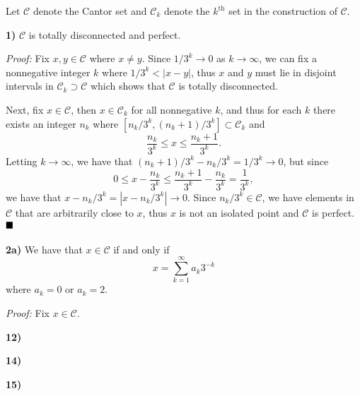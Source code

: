 \documentclass[12pt]{article}
\newcommand{\vertb}[1]{\left\vert#1\right\vert}
\newcommand{\mc}[1]{\ensuremath{\mathcal{#1}}}
\newcommand{\done}{\ensuremath{\strut\hfill\blacksquare}}
\newcommand{\proof}{\textit{Proof: }}
\begin{document}
\pagestyle{fancy}

\setlength{\parindent}{0in}
\setlength{\parskip}{0.1in}

Let \( \mc{C} \) denote the Cantor set and \( \mc{C}_k \) denote the
\( k^\text{th} \) set in the construction of \( \mc{C} \).

\textbf{1)} \( \mc{C} \) is totally disconnected and perfect.

\proof
Fix \( x, y \in \mc{C} \) where \( x \ne y \).
Since \( 1 / 3^k \to 0 \) as \( k \to \infty \), we can fix a nonnegative
integer \( k \) where \( 1 / 3^k < \vertb{x - y} \), thus \( x \) and \( y \)
must lie in disjoint intervals in \( \mc{C}_k \supset \mc{C} \) which
shows that \( \mc{C} \) is totally disconnected.

Next, fix \( x \in \mc{C} \), then \( x \in \mc{C}_k \) for all nonnegative
\( k \), and thus for each \( k \) there exists an integer \( n_k \) where
\( [n_k / 3^k, (n_k + 1) / 3^k] \subset \mc{C}_k \) and
\[
	\frac{n_k}{3^k} \leq x \leq \frac{n_k + 1}{3^k}.
\]
Letting \( k \to \infty \), we have that
\( (n_k + 1) / 3^k - n_k / 3^k = 1 / 3^k \to 0 \), but since
\[
	0
	\leq x - \frac{n_k}{3^k}
	\leq \frac{n_k + 1}{3^k} - \frac{n_k}{3^k}
	= \frac{1}{3^k},
\]
we have that \( x - n_k / 3^k = \vertb{x - n_k / 3^k} \to 0 \).
Since \( n_k / 3^k \in \mc{C} \), we have elements in \( \mc{C} \) that are
arbitrarily close to \( x \), thus \( x \) is not an isolated point and
\( \mc{C} \) is perfect.
\done

\textbf{2a)} We have that \( x \in \mc{C} \) if and only if
\[
	x = \sum_{k = 1}^\infty a_k3^{-k}
\]
where \( a_k = 0 \) or \( a_k = 2 \).

\proof
Fix \( x \in \mc{C} \).

\textbf{12)}

\textbf{14)}

\textbf{15)}
\end{document}
